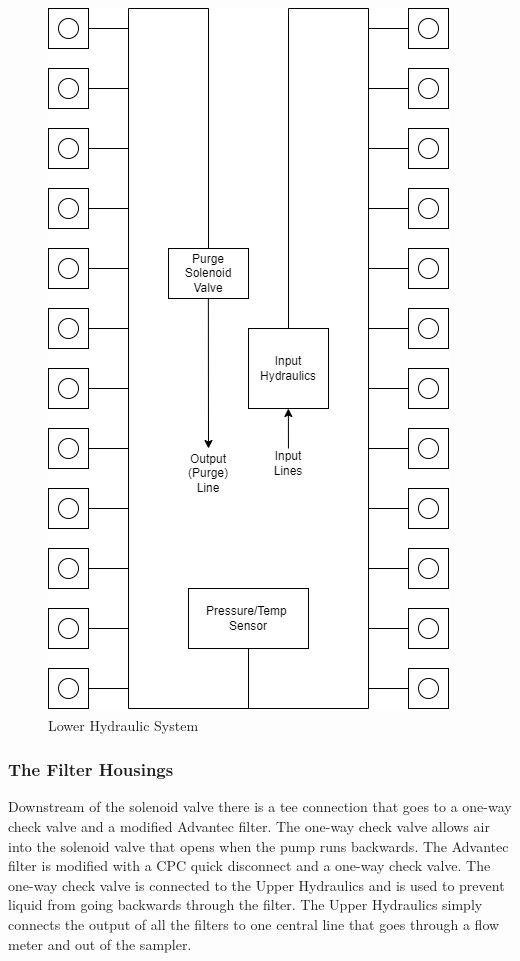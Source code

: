 \documentclass[11pt, letterpaper]{article}
\begin{document}
\begin{figure}[H] %
	\centering
	\includegraphics[scale=0.65, angle=-90]{./Assets/PolyWAG_HX_HD_LHR.png}
	\caption{Lower Hydraulic System}
\end{figure}


\subsubsection{The Filter Housings}
Downstream of the solenoid valve there is a tee connection that goes to a one-way check valve and a modified Advantec filter. The one-way check valve allows air into the solenoid valve that opens when the pump runs backwards. The Advantec filter is modified with a CPC quick disconnect and a one-way check valve. The one-way check valve is connected to the Upper Hydraulics and is used to prevent liquid from going backwards through the filter. The Upper Hydraulics simply connects the output of all the filters to one central line that goes through a flow meter and out of the sampler. 
\end{document}
